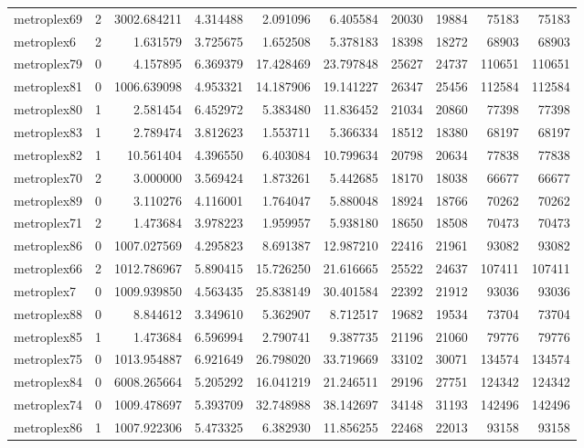 \begin{longtable}{|l|r|r|r|r|r|r|r|r|r|}
metroplex69 & 2 & 3002.684211 & 4.314488 & 2.091096 & 6.405584 & 20030 & 19884 & 75183 & 75183 \\
metroplex6 & 2 & 1.631579 & 3.725675 & 1.652508 & 5.378183 & 18398 & 18272 & 68903 & 68903 \\
metroplex79 & 0 & 4.157895 & 6.369379 & 17.428469 & 23.797848 & 25627 & 24737 & 110651 & 110651 \\
metroplex81 & 0 & 1006.639098 & 4.953321 & 14.187906 & 19.141227 & 26347 & 25456 & 112584 & 112584 \\
metroplex80 & 1 & 2.581454 & 6.452972 & 5.383480 & 11.836452 & 21034 & 20860 & 77398 & 77398 \\
metroplex83 & 1 & 2.789474 & 3.812623 & 1.553711 & 5.366334 & 18512 & 18380 & 68197 & 68197 \\
metroplex82 & 1 & 10.561404 & 4.396550 & 6.403084 & 10.799634 & 20798 & 20634 & 77838 & 77838 \\
metroplex70 & 2 & 3.000000 & 3.569424 & 1.873261 & 5.442685 & 18170 & 18038 & 66677 & 66677 \\
metroplex89 & 0 & 3.110276 & 4.116001 & 1.764047 & 5.880048 & 18924 & 18766 & 70262 & 70262 \\
metroplex71 & 2 & 1.473684 & 3.978223 & 1.959957 & 5.938180 & 18650 & 18508 & 70473 & 70473 \\
metroplex86 & 0 & 1007.027569 & 4.295823 & 8.691387 & 12.987210 & 22416 & 21961 & 93082 & 93082 \\
metroplex66 & 2 & 1012.786967 & 5.890415 & 15.726250 & 21.616665 & 25522 & 24637 & 107411 & 107411 \\
metroplex7 & 0 & 1009.939850 & 4.563435 & 25.838149 & 30.401584 & 22392 & 21912 & 93036 & 93036 \\
metroplex88 & 0 & 8.844612 & 3.349610 & 5.362907 & 8.712517 & 19682 & 19534 & 73704 & 73704 \\
metroplex85 & 1 & 1.473684 & 6.596994 & 2.790741 & 9.387735 & 21196 & 21060 & 79776 & 79776 \\
metroplex75 & 0 & 1013.954887 & 6.921649 & 26.798020 & 33.719669 & 33102 & 30071 & 134574 & 134574 \\
metroplex84 & 0 & 6008.265664 & 5.205292 & 16.041219 & 21.246511 & 29196 & 27751 & 124342 & 124342 \\
metroplex74 & 0 & 1009.478697 & 5.393709 & 32.748988 & 38.142697 & 34148 & 31193 & 142496 & 142496 \\
metroplex86 & 1 & 1007.922306 & 5.473325 & 6.382930 & 11.856255 & 22468 & 22013 & 93158 & 93158 \\

\end{longtable}
